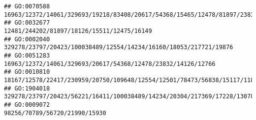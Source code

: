 \documentclass[
]{article}
\begin{document}
\begin{verbatim}
## GO:0070588                                                                                                                                                                                                                                                                                         16963/12372/14061/329693/19218/83408/20617/54368/15465/12478/81897/23832/246788/14169/58226/12482/14126/329064/12766
## GO:0032677                                                                                                                                                                                                                                                                                                                                                                   12481/244202/81897/18126/15511/12475/16149
## GO:0002040                                                                                                                                                                                                                                                                                                                                            329278/23797/20423/100038489/12554/14234/16160/18053/217721/19876
## GO:0051283                                                                                                                                                                                                                                                                                                                                                 16963/12372/14061/329693/20617/54368/12478/23832/14126/12766
## GO:0010810                                                                                                                                                                                                                                                                                                                        18167/12578/22417/230959/20750/109648/12554/12501/78473/56838/15117/11815/30060/54156
## GO:1904018                                                                                                                                                                                                                                                                                                                                329278/23797/20423/56221/16411/100038489/14234/20304/217369/17228/13078/12766
## GO:0009072                                                                                                                                                                                                                                                                                                                                                                                98256/70789/56720/21990/15930

\end{verbatim}
\end{document}
